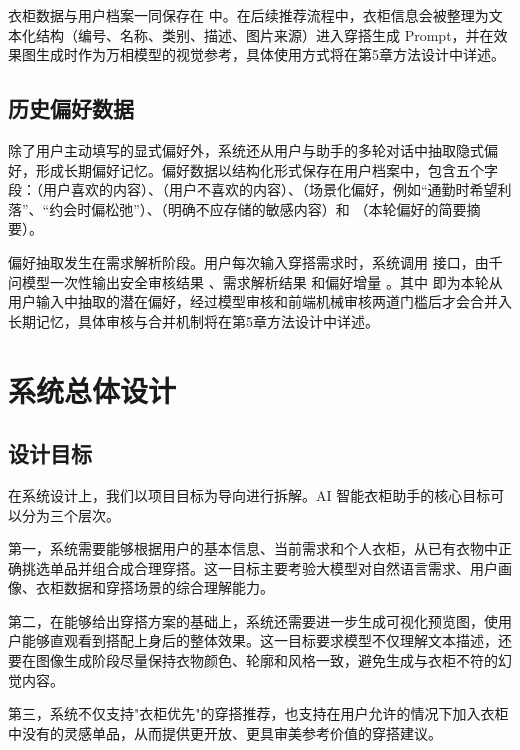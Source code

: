 \documentclass{applemlr}
\begin{document}
衣柜数据与用户档案一同保存在  中。在后续推荐流程中，衣柜信息会被整理为文本化结构（编号、名称、类别、描述、图片来源）进入穿搭生成 Prompt，并在效果图生成时作为万相模型的视觉参考，具体使用方式将在第5章方法设计中详述。

\subsection{历史偏好数据}

除了用户主动填写的显式偏好外，系统还从用户与助手的多轮对话中抽取隐式偏好，形成长期偏好记忆。偏好数据以结构化形式保存在用户档案中，包含五个字段：（用户喜欢的内容）、（用户不喜欢的内容）、（场景化偏好，例如``通勤时希望利落''、``约会时偏松弛''）、（明确不应存储的敏感内容）和 （本轮偏好的简要摘要）。

偏好抽取发生在需求解析阶段。用户每次输入穿搭需求时，系统调用  接口，由千问模型一次性输出安全审核结果 、需求解析结果  和偏好增量 。其中  即为本轮从用户输入中抽取的潜在偏好，经过模型审核和前端机械审核两道门槛后才会合并入长期记忆，具体审核与合并机制将在第5章方法设计中详述。


\section{系统总体设计}
\label{sec:system-design}

\subsection{设计目标}

在系统设计上，我们以项目目标为导向进行拆解。AI 智能衣柜助手的核心目标可以分为三个层次。

第一，系统需要能够根据用户的基本信息、当前需求和个人衣柜，从已有衣物中正确挑选单品并组合成合理穿搭。这一目标主要考验大模型对自然语言需求、用户画像、衣柜数据和穿搭场景的综合理解能力。

第二，在能够给出穿搭方案的基础上，系统还需要进一步生成可视化预览图，使用户能够直观看到搭配上身后的整体效果。这一目标要求模型不仅理解文本描述，还要在图像生成阶段尽量保持衣物颜色、轮廓和风格一致，避免生成与衣柜不符的幻觉内容。

第三，系统不仅支持"衣柜优先"的穿搭推荐，也支持在用户允许的情况下加入衣柜中没有的灵感单品，从而提供更开放、更具审美参考价值的穿搭建议。
\end{document}

